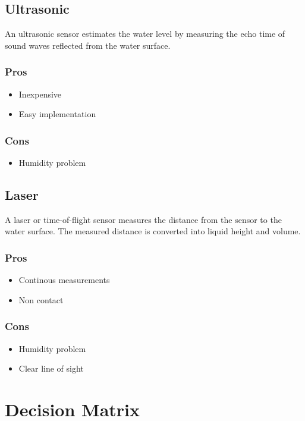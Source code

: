 \documentclass[12pt]{article}
\begin{document}
\subsection{Ultrasonic}
An ultrasonic sensor estimates the water level by measuring the echo time of sound waves reflected from the water surface.
\subsubsection{Pros}
    \begin{itemize}
    \item Inexpensive
    \item Easy implementation
    \end{itemize}
\subsubsection{Cons}
    \begin{itemize}
    \item Humidity problem
    \end{itemize}

\subsection{Laser}
A laser or time-of-flight sensor measures the distance from the sensor to the water surface.
The measured distance is converted into liquid height and volume.
\subsubsection{Pros}
    \begin{itemize}
    \item Continous measurements
    \item Non contact
    \end{itemize}
\subsubsection{Cons}
    \begin{itemize}
    \item Humidity problem
    \item Clear line of sight
    \end{itemize}

    \section{Decision Matrix}
\end{document}
